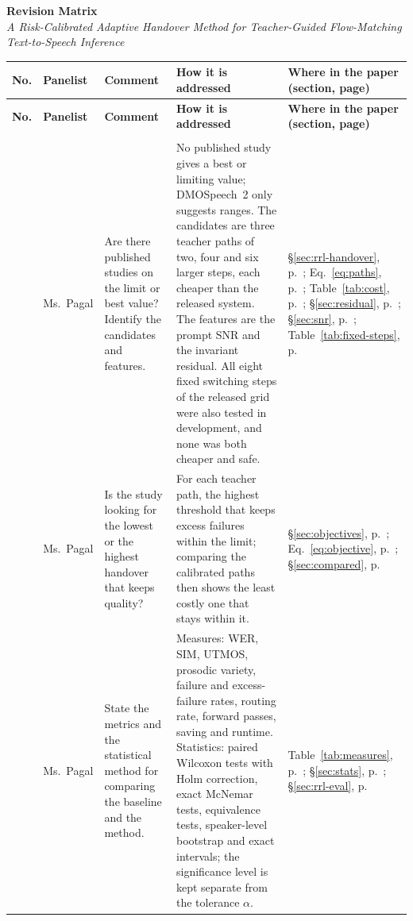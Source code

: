 \documentclass[11pt]{article}
\newcommand{\loc}[1]{\S\ref{#1}, p.~\pageref{#1}}
\begin{document}
{\large\bfseries Revision Matrix}\\[2pt]
\textit{A Risk-Calibrated Adaptive Handover Method for Teacher-Guided Flow-Matching Text-to-Speech Inference}

\medskip
{\small
\setlength{\tabcolsep}{4pt}
\renewcommand{\arraystretch}{1.15}
\begin{longtable}{@{}>{\raggedright\arraybackslash}p{0.6cm} >{\raggedright\arraybackslash}p{2.0cm} >{\raggedright\arraybackslash}p{5.4cm} >{\raggedright\arraybackslash}p{10.2cm} >{\raggedright\arraybackslash}p{5.0cm}@{}}
\toprule
\textbf{No.} & \textbf{Panelist} & \textbf{Comment} & \textbf{How it is addressed} & \textbf{Where in the paper (section, page)} \\
\midrule
\endfirsthead
\toprule
\textbf{No.} & \textbf{Panelist} & \textbf{Comment} & \textbf{How it is addressed} & \textbf{Where in the paper (section, page)} \\
\midrule
\endhead
\midrule\multicolumn{5}{r}{\textit{Continued on next page}}\\
\endfoot
\bottomrule
\endlastfoot
1 & Ms.~Pagal & Are there published studies on the limit or best value? Identify the candidates and features. & No published study gives a best or limiting value; DMOSpeech~2 only suggests ranges. The candidates are three teacher paths of two, four and six larger steps, each cheaper than the released system. The features are the prompt SNR and the invariant residual. All eight fixed switching steps of the released grid were also tested in development, and none was both cheaper and safe. & \loc{sec:rrl-handover}; Eq.~\ref{eq:paths}, p.~\pageref{eq:paths}; Table~\ref{tab:cost}, p.~\pageref{tab:cost}; \loc{sec:residual}; \loc{sec:snr}; Table~\ref{tab:fixed-steps}, p.~\pageref{tab:fixed-steps} \\
2 & Ms.~Pagal & Is the study looking for the lowest or the highest handover that keeps quality? & For each teacher path, the highest threshold that keeps excess failures within the limit; comparing the calibrated paths then shows the least costly one that stays within it. & \loc{sec:objectives}; Eq.~\ref{eq:objective}, p.~\pageref{eq:objective}; \loc{sec:compared} \\
3 & Ms.~Pagal & State the metrics and the statistical method for comparing the baseline and the method. & Measures: WER, SIM, UTMOS, prosodic variety, failure and excess-failure rates, routing rate, forward passes, saving and runtime. Statistics: paired Wilcoxon tests with Holm correction, exact McNemar tests, equivalence tests, speaker-level bootstrap and exact intervals; the significance level is kept separate from the tolerance $\alpha$. & Table~\ref{tab:measures}, p.~\pageref{tab:measures}; \loc{sec:stats}; \loc{sec:rrl-eval} \\

\end{longtable}}
\end{document}
